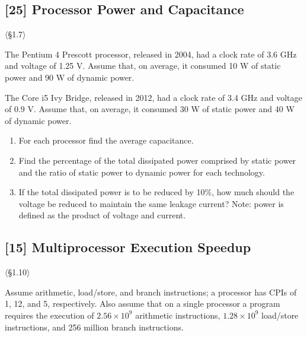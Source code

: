 \problembreak %

\subsection{[25] Processor Power and Capacitance}
\hypertarget{prob-1.9}{}
\noindent$\langle$\S1.7$\rangle$\medskip

\noindent The Pentium 4 Prescott processor, released in 2004, had a clock rate of 3.6
GHz and voltage of 1.25 V. Assume that, on average, it consumed 10 W of
static power and 90 W of dynamic power.

The Core i5 Ivy Bridge, released in 2012, had a clock rate of 3.4 GHz and
voltage of 0.9 V. Assume that, on average, it consumed 30 W of static power
and 40 W of dynamic power.

\begin{enumerate}
  \item[1.9.1] [5] For each processor find the average capacitance.
  \item[1.9.2] [5] Find the percentage of the total dissipated power comprised by
        static power and the ratio of static power to dynamic power for each
        technology.
  \item[1.9.3] [15] If the total dissipated power is to be reduced by 10\%, how
        much should the voltage be reduced to maintain the same leakage
        current? Note: power is defined as the product of voltage and current.
\end{enumerate}

\problembreak %

\subsection{[15] Multiprocessor Execution Speedup}
\hypertarget{prob-1.10}{}
\noindent$\langle$\S1.10$\rangle$\medskip

\noindent Assume arithmetic, load/store, and branch instructions; a processor has CPIs
of 1, 12, and 5, respectively. Also assume that on a single processor a
program requires the execution of $2.56 \times 10^9$ arithmetic instructions,
$1.28 \times 10^9$ load/store instructions, and 256 million branch
instructions.

